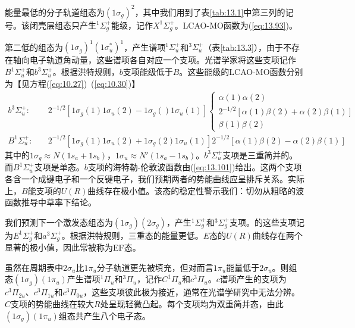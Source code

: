     能量最低的分子轨道组态为$\left(1\sigma_g\right)^2$，其中我们用到了表\ref{tab:13.1}中第三列的记号。该闭壳层组态只产生$^1\Sigma_g^+$能级，记作$X^1\Sigma_g^+$。LCAO-MO函数为(\ref{eq:13.93})。

    第二低的组态为$\left(1\sigma_g\right)^1\left(1\sigma_u^*\right)^1$，产生谱项$^1\Sigma_u^+$和$^3\Sigma_u^+$（表\ref{tab:13.3}），由于不存在轴向电子轨道角动量，这些谱项各自对应一个支项。光谱学家将这些支项记作$B^1\Sigma_u^+$和$b^3\Sigma_u^+$。根据洪特规则，$b$支项能级低于$B$。这些能级的LCAO-MO函数分别为【见方程(\ref{eq:10.27})~(\ref{eq:10.30})】
    \begin{equation*}
        \begin{aligned}
            b^3\Sigma_u^+:& \quad 2^{-1/2}\left[1\sigma_g\left(1\right)1\sigma_u\left(2\right)-1\sigma_g\left(\right)1\sigma_u\left(1\right)\right] \left\{ \begin{array}{l}
                \alpha\left(1\right)\alpha\left(2\right) \\
                2^{-1/2}\left[\alpha\left(1\right)\beta\left(2\right)+\alpha\left(2\right)\beta\left(1\right)\right] \\
                \beta\left(1\right)\beta\left(2\right)
            \end{array}\right.   \\
            B^1\Sigma_u^+:& \quad 2^{-1/2}\left[1\sigma_g\left(1\right)1\sigma_u\left(2\right)+1\sigma_g\left(2\right)1\sigma_u\left(1\right)\right] 2^{-1/2}\left[\alpha\left(1\right)\beta\left(2\right)-\alpha\left(2\right)\beta\left(1\right)\right]
        \end{aligned}
    \end{equation*}
    其中的$1\sigma_g \approx N\left(1s_a + 1s_b\right)$，$1\sigma_u \approx N'\left(1s_a - 1s_b\right)$。$b^3\Sigma_u^+$支项是三重简并的。而$B^1\Sigma_u^+$支项是单态。$b$支项的海特勒-伦敦波函数由(\ref{eq:13.101})给出。这两个支项各含一个成键电子和一个反键电子，我们预期两者的势能曲线应呈排斥关系。实际上，$B$能支项的$U\left(R\right)$曲线存在极小值。该态的稳定性警示我们：切勿从粗略的波函数推导中草率下结论。

    我们预测下一个激发态组态为$\left(1\sigma_g\right)\left(2\sigma_g\right)$，产生$^1\Sigma_g^+$和$^3\Sigma_g^+$支项。的这些支项记为$E^1\Sigma_g^+$和$a^3\Sigma_g^+$。根据洪特规则，三重态的能量更低。$E$态的$U\left(R\right)$曲线存在两个显著的极小值，因此常被称为EF态。

    虽然在周期表中$2\sigma_u$比$1\pi_u$分子轨道更先被填充，但对而言$1\pi_u$能量低于$2\sigma_u$。则组态$\left(1\sigma_g\right)\left(1\pi_u\right)$产生谱项$^1\Pi_u$和$^3\Pi_u$，记作$C^1\Pi_u$和$c^3\Pi_u$。$c$谱项产生的支项为$c^3\Pi_{2u}$、$c^3\Pi_{1u}$和$c^3\Pi_{0u}$，这些支项彼此极为接近，通常在光谱学研究中无法分辨。$C$支项的势能曲线在较大$R$处呈现轻微凸起。每个支项均为双重简并态，由此$\left(1\sigma_g\right)\left(1\pi_u\right)$组态共产生八个电子态。

